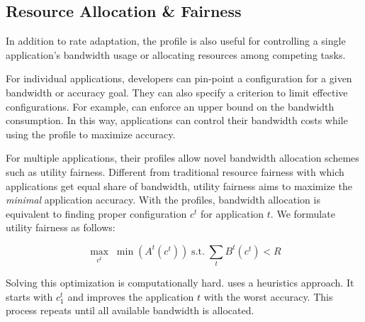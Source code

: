 \subsection{Resource Allocation \& Fairness}

In addition to rate adaptation, the profile is also useful for controlling a
single application's bandwidth usage or allocating resources among competing
tasks.

For individual applications, developers can pin-point a configuration for a
given bandwidth or accuracy goal. They can also specify a criterion to limit
effective configurations. For example, \sysname{} can enforce an upper bound on
the bandwidth consumption. In this way, applications can control their bandwidth
costs while using the profile to maximize accuracy.

For multiple applications, their profiles allow novel bandwidth allocation
schemes such as utility fairness. Different from traditional resource fairness
with which applications get equal share of bandwidth, utility fairness aims to
maximize the \textit{minimal} application accuracy. With the profiles, bandwidth
allocation is equivalent to finding proper configuration $c^t$ for application
$t$. We formulate utility fairness as follows:


\begin{equation}
 \label{eq:multitask}
 \underset{c^t}{\max} \; \min({A^t(c^t)})
 \;
 \text{s.t.}
 \;
 \sum_t{B^t(c^t)} < R
\end{equation}


Solving this optimization is computationally hard. \sysname{} uses a heuristics
approach. It starts with $c^t_1$ and improves the application $t$ with the worst
accuracy. This process repeats until all available bandwidth is allocated. 

